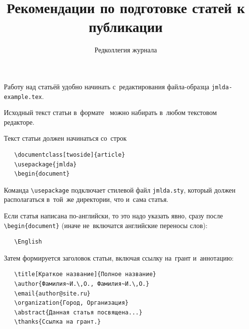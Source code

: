\documentclass[12pt,twoside]{article}
\begin{document}
\title{Рекомендации по подготовке статей к публикации}
\author{Редколлегия журнала}

\maketitle
Работу над статьёй удобно начинать с~редактирования
файла-образца \verb'jmlda-example.tex'.

Исходный текст статьи в~формате \LaTeXe\
можно набирать в~любом текстовом редакторе.

Текст статьи должен начинаться со~строк
{\small\begin{verbatim}
   \documentclass[twoside]{article}
   \usepackage{jmlda}
   \begin{document}
\end{verbatim}}

Команда \verb'\usepackage' подключает стилевой файл \verb'jmlda.sty',
который должен располагаться в~той~же директории, что и~сама статья.



Если статья написана по-английски, то это надо указать явно,
сразу после \verb|\begin{document}|
(иначе не~включатся английские переносы слов):
{\small\begin{verbatim}
   \English
\end{verbatim}}

Затем формируется заголовок статьи, включая ссылку на~грант и~аннотацию:
{\small\begin{verbatim}
   \title[Краткое название]{Полное название}
   \author{Фамилия~И.\,О., Фамилия~И.\,О.}
   \email{author@site.ru}
   \organization{Город, Организация}
   \abstract{Данная статья посвящена...}
   \thanks{Ссылка на грант.}
\end{verbatim}}
\end{document}
